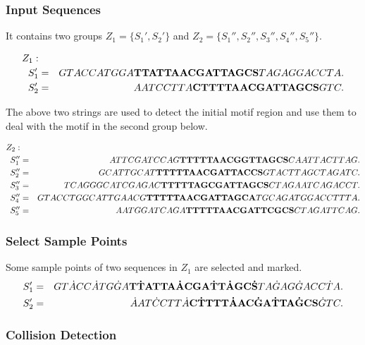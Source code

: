 \documentclass[11pt]{article}
\begin{document}
\subsubsection{Input Sequences}

It contains two groups $Z_1=\{S_1',S_2'\}$ and
$Z_2=\{S_1'',S_2'',S_3'', S_4'', S_5''\}$.

\begin{eqnarray*}
Z_1:&&\\
 S_1'&=&GTACCATGGA{\Large\bf TT{\small
 A}TTAACGATTAGCS}TAGAGGACCTA.\\
S_2'&=&AATCCTTA{\Large\bf {\small C}TTTTAACGATTAGCS}GTC.
\end{eqnarray*}

The above two strings are used to detect the initial motif region
and use them to deal with the motif in the second group below.



\begin{eqnarray*}
Z_2:&&\\
 S_1''&=&ATTCGATCCAG{\Large\bf
TTTTTAACG{\small{G}}TTAGCS}CAATTACTTAG.\\
S_2''&=&GCATTGCAT{\Large\bf
TTTTTAACGATTA{\small{C}}CS}GTACTTAGCTAGATC.\\
S_3''&=&TCAGGGCATCGAGAC{\Large\bf
TTTTTA{\small{G}}CGATTAGCS}CTAGAATCAGACCT.\\
S_4''&=&GTACCTGGCATTGAACG{\Large\bf
TTTTTAACGATTAGC{\small{A}}}TGCAGATGGACCTTTA.\\
S_5''&=&AATGGATCAGA{\Large\bf TTTTTAACGATT{\small{C}}GCS}CTAGATTCAG.
\end{eqnarray*}


\subsubsection{Select Sample Points}

Some sample points of two sequences in $Z_1$ are selected and
marked.
\begin{eqnarray*}
 S_1'&=&GT\dot{A}CC\dot{A}TG\dot{G}A{\Large\bf T\dot{T}{\small A}{T}TA\dot{A}CGA\dot{T}T\dot{A}GC\dot{S}}TA\dot{G}AG\dot{G}ACC\dot{T}A.\\
S_2'&=&\dot{A}AT\dot{C}CTT\dot{A}{\Large\bf {\small
C}\dot{T}TTT\dot{A}AC\dot{G}A\dot{T}TA\dot{G}CS}\dot{G}TC.
\end{eqnarray*}


\subsubsection{Collision Detection}
\end{document}
